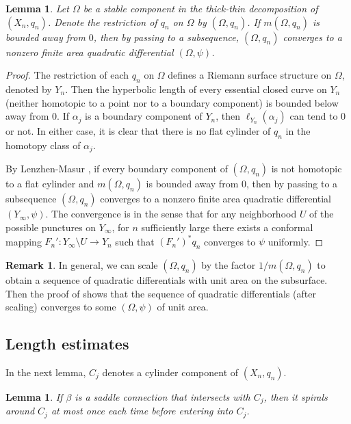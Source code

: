 \documentclass{amsart}
\theoremstyle{plain}
\newtheorem{lemma}[theorem]{Lemma}
\theoremstyle{definition}
\newtheorem{remark}{Remark}
\numberwithin{equation}{section}
\begin{document}
 
 
 
\begin{lemma}\label{lem:stable}
Let $\Omega$ be a stable component in the thick-thin decomposition of $(X_n, q_n)$. 
Denote the restriction of $q_n$ on $\Omega$ by $(\Omega, q_n)$.
If $m(\Omega, q_n)$ is bounded away from $0$,
then by passing to a subsequence, 
$(\Omega, q_n)$ converges to a nonzero finite area quadratic differential
$(\Omega, \psi)$.
\end{lemma}
\begin{proof}
 The restriction of each $q_n$ on $\Omega$ defines a Riemann surface structure on $\Omega$, denoted by $Y_n$.
Then the hyperbolic length of every essential closed curve on $Y_n$ (neither homotopic to a point nor  to a boundary component) is bounded below away from $0$. If $\alpha_j$ is a boundary component of $Y_n$,
then $\ell_{Y_n}(\alpha_j)$ can tend to $0$ or not. In either case, it is clear that 
there is no flat cylinder of $q_n$ in the homotopy class of $\alpha_j$. 

By Lenzhen-Masur \cite[Theorem 2]{LM2010}, if every boundary component of 
$(\Omega, q_n)$ is not homotopic to a flat cylinder 
and $m(\Omega, q_n)$ is bounded away from $0$,
then by passing to a subsequence $(\Omega, q_n)$ converges to a nonzero finite area quadratic differential $(Y_\infty, \psi)$. The convergence is in the sense that for any neighborhood $U$ of the possible punctures on $Y_\infty$,
for $n$ sufficiently large there exists a conformal mapping $F_n' : Y_\infty \setminus U \to Y_n$
such that $(F_n')^*q_n$ converges to $\psi$ uniformly.
\end{proof}


\begin{remark}
In general, we can scale $(\Omega, q_n)$ by the factor $1/ m(\Omega, q_n)$ to obtain a sequence of quadratic differentials with unit area on the subsurface. 
Then the proof of \cite[Theorem 2]{LM2010}
shows that the sequence of quadratic differentials (after scaling) converges to some $(\Omega, \psi)$ of unit area.
\end{remark}


\subsection{Length estimates}

In the next lemma, $C_j$ denotes a cylinder component of $(X_n,q_n)$.
\begin{lemma}\label{lem:spiral}
If $\beta$ is a saddle connection that intersects with $C_j$, then it spirals around $C_j$ at most once 
each time before entering into $C_j$.
\end{lemma}
\end{document}
